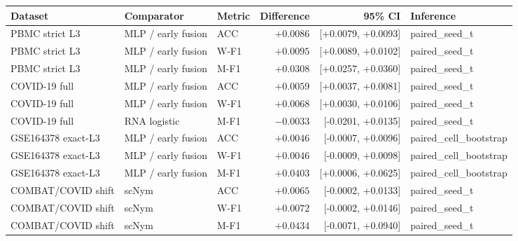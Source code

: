 \begin{tabular}{lllrrl}
\toprule
Dataset & Comparator & Metric & Difference & 95\% CI & Inference \\
\midrule
PBMC strict L3 & MLP / early fusion & ACC & $+0.0086$ & [+0.0079, +0.0093] & paired\_seed\_t \\
PBMC strict L3 & MLP / early fusion & W-F1 & $+0.0095$ & [+0.0089, +0.0102] & paired\_seed\_t \\
PBMC strict L3 & MLP / early fusion & M-F1 & $+0.0308$ & [+0.0257, +0.0360] & paired\_seed\_t \\
COVID-19 full & MLP / early fusion & ACC & $+0.0059$ & [+0.0037, +0.0081] & paired\_seed\_t \\
COVID-19 full & MLP / early fusion & W-F1 & $+0.0068$ & [+0.0030, +0.0106] & paired\_seed\_t \\
COVID-19 full & RNA logistic & M-F1 & $-0.0033$ & [-0.0201, +0.0135] & paired\_seed\_t \\
GSE164378 exact-L3 & MLP / early fusion & ACC & $+0.0046$ & [-0.0007, +0.0096] & paired\_cell\_bootstrap \\
GSE164378 exact-L3 & MLP / early fusion & W-F1 & $+0.0046$ & [-0.0009, +0.0098] & paired\_cell\_bootstrap \\
GSE164378 exact-L3 & MLP / early fusion & M-F1 & $+0.0403$ & [+0.0006, +0.0625] & paired\_cell\_bootstrap \\
COMBAT/COVID shift & scNym & ACC & $+0.0065$ & [-0.0002, +0.0133] & paired\_seed\_t \\
COMBAT/COVID shift & scNym & W-F1 & $+0.0072$ & [-0.0002, +0.0146] & paired\_seed\_t \\
COMBAT/COVID shift & scNym & M-F1 & $+0.0434$ & [-0.0071, +0.0940] & paired\_seed\_t \\
\bottomrule
\end{tabular}
